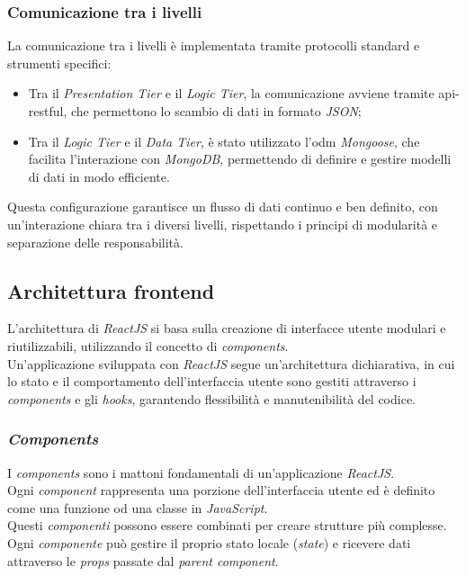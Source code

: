 \subsubsection{Comunicazione tra i livelli}

\noindent La comunicazione tra i livelli è implementata tramite protocolli standard e strumenti specifici:
\begin{itemize}
    \item Tra il \textit{Presentation Tier} e il \textit{Logic Tier}, la comunicazione avviene tramite \gls{api-restful}, che permettono lo scambio di dati in formato \textit{JSON};
    \item Tra il \textit{Logic Tier} e il \textit{Data Tier}, è stato utilizzato l'\gls{odm} \textit{Mongoose}, che facilita l'interazione con \textit{MongoDB}, permettendo di definire e gestire modelli di dati in modo efficiente.
\end{itemize}

\noindent Questa configurazione garantisce un flusso di dati continuo e ben definito, con un'interazione chiara tra i diversi livelli, rispettando i principi di modularità e separazione delle responsabilità.

\pagebreak

\subsection*{Architettura frontend}

L'architettura di \textit{ReactJS} si basa sulla creazione di interfacce utente modulari e riutilizzabili, utilizzando il concetto di \textit{components}. \\
Un'applicazione sviluppata con \textit{ReactJS} segue un'architettura dichiarativa, in cui lo stato e il comportamento dell'interfaccia utente sono gestiti attraverso i \textit{components} e gli \textit{hooks}, garantendo flessibilità e manutenibilità del codice.

\subsubsection{\textit{Components}}

I \textit{components} sono i mattoni fondamentali di un'applicazione \textit{ReactJS}.\\
Ogni \textit{component} rappresenta una porzione dell'interfaccia utente ed è definito come una funzione od una classe in \textit{JavaScript}.\\
Questi \textit{componenti} possono essere combinati per creare strutture più complesse.\\
Ogni \textit{componente} può gestire il proprio stato locale (\textit{state}) e ricevere dati attraverso le \textit{props} passate dal \textit{parent component}. \\

